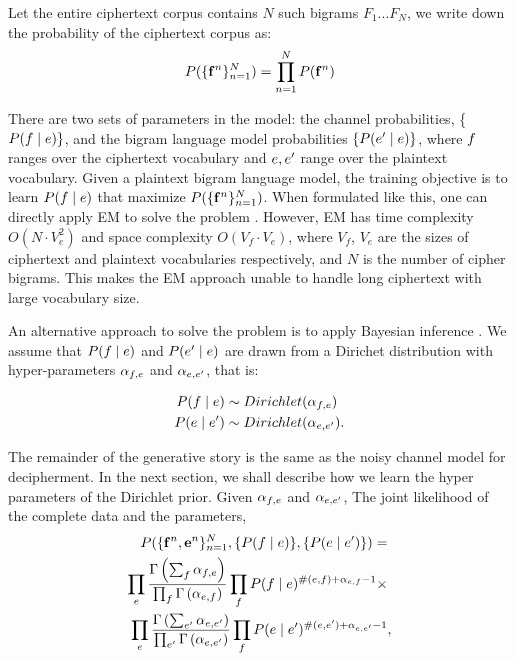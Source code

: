 Let the entire ciphertext corpus contains $N$ such bigrams $F_{1}...F_{N}$, we write down the probability of the ciphertext corpus as:
%
\[
\label{p_corpus}
P( \{ \mathbf{f}^n \}_{n=1}^{N} ) =  \prod_{n=1}^{N} P(\mathbf{f}^{n})
\]
%

There are two sets of parameters in the model: the channel probabilities, \{ $P(f \mid e) \} $, and the bigram language model probabilities $\{ P(e' \mid e) \} $, where $f$ ranges over the ciphertext vocabulary and $e,e'$ range over the plaintext vocabulary. Given a plaintext bigram language model, the training objective is to learn $P(f \mid e)$ that maximize $P( \{ \mathbf{f}^n \}_{n=1}^{N} )$. When formulated like this, one can directly apply EM to solve the problem \cite{knight-EtAl:2006}. However, EM has time complexity $O( N\cdot V_{e}^{2})$ and space complexity $O(V_{f}\cdot V_{e})$, where $V_{f}$, $V_{e}$ are the sizes of ciphertext and plaintext vocabularies respectively, and $N$ is the number of cipher bigrams. This makes the EM approach unable to handle long ciphertext with large vocabulary size. 

An alternative approach to solve the problem is to apply Bayesian inference \cite{ravi-knight:2011,Dou:2012}. We assume that $P(f \mid e)$ and $P(e' \mid e)$ are drawn from a Dirichet distribution with hyper-parameters $\alpha_{f,e}$ and $\alpha_{e,e'}$, that is: 

\begin{align*}
P(f \mid e) & \sim Dirichlet(\alpha_{f,e}) \\ 
P(e \mid e') & \sim Dirichlet(\alpha_{e,e'}).
\end{align*}

The remainder of the generative story is the same as the noisy channel model for decipherment. In the next section, we shall describe how we learn the hyper parameters of the Dirichlet prior. Given $\alpha_{f,e}$ and $\alpha_{e,e'}$, The joint likelihood of the complete data and the parameters,
\begin{align*}
P( \{ \mathbf{f}^n , \mathbf{e}^n \}_{n=1}^{N}, \{ P(f \mid e) \}, \{ P(e \mid e') \} ) = & \\
 \prod_{e}  \frac{\Gamma \left( \sum_{f} \alpha_{f,e} \right)} {\prod_{f} \Gamma \left( \alpha_{e,f} \right)} \prod_{f} P(f \mid e)^{\#(e,f)+\alpha_{e,f}-1}  \times & \\
  \prod_{e}  \frac{\Gamma \left( \sum_{e'} \alpha_{e,e'} \right)} {\prod_{e'} \Gamma \left( \alpha_{e,e'} \right)} \prod_{f} P(e \mid e')^{\#(e,e')+\alpha_{e,e'}-1}  &, 
\end{align*}

